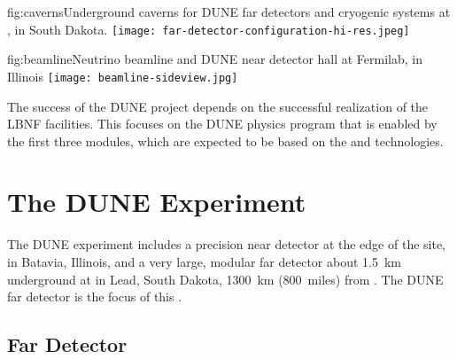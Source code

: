 \begin{dunefigure}{fig:caverns}{Underground caverns for DUNE far detectors and cryogenic systems at \surf{}, in South Dakota.}
\texttt{[image: far-detector-configuration-hi-res.jpeg]}
\end{dunefigure}

\begin{dunefigure}{fig:beamline}{Neutrino beamline and DUNE near detector hall at Fermilab, in Illinois}
\texttt{[image: beamline-sideview.jpg]}
\end{dunefigure}


The success of the DUNE project depends on the successful realization of the LBNF facilities.
This  focuses on the DUNE physics program that is enabled by
the first three  modules, which are expected to be based on the  and  \lar technologies. 

\section{The DUNE Experiment}

The DUNE experiment includes a precision near detector at the edge of the \fnal site, in Batavia, Illinois, and a very large, modular far detector about \SI{1.5}{km} underground at \surf in Lead, South Dakota, \SI{1300}{km} (\SI{800}{miles}) from \fnal. The DUNE far detector is the focus of this . 


\subsection{Far Detector}
\label{ch:dune-det-tech-ov-fd}


